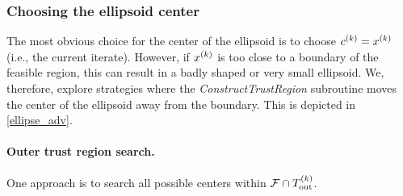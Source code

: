 









\subsubsection{Choosing the ellipsoid center}
\label{center_searches}

The most obvious choice for the center of the ellipsoid is to choose $c^{(k)} = x^{(k)}$ (i.e., the current iterate).  
However, if $x^{(k)}$ is too close to a boundary of the feasible region, this can result in a badly shaped or very small ellipsoid.
We, therefore, explore strategies where the \emph{ConstructTrustRegion} subroutine moves the center of the ellipsoid away from the boundary. 
This is depicted in \cref{ellipse_adv}.



\paragraph{Outer trust region search.}

One approach is to search all possible centers within ${\mathcal F} \cap {T_{\text{out}}^{(k)}} $.  


